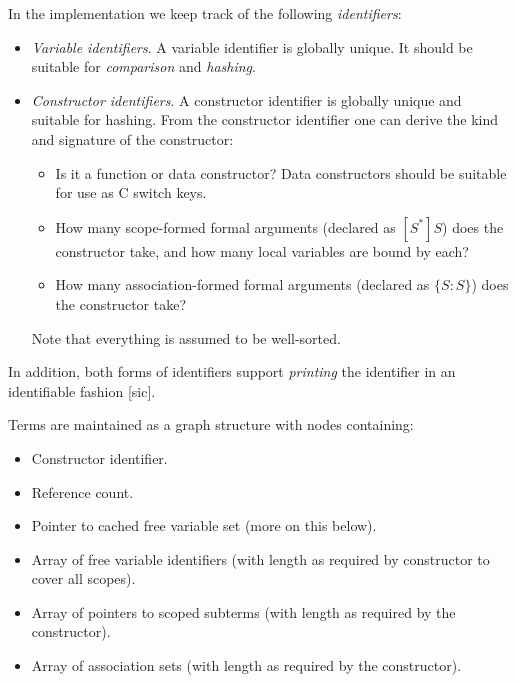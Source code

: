\documentclass[letterpaper,11pt]{article}
\begin{document}
\begin{definition}[identifiers]
  In the implementation we keep track of the following \emph{identifiers}:
  \begin{itemize}

  \item \emph{Variable identifiers}. A variable identifier is globally unique. It should be suitable
    for \emph{comparison} and \emph{hashing}.

  \item \emph{Constructor identifiers}. A constructor identifier is globally unique and suitable for
    hashing. From the constructor identifier one can derive the kind and signature of the
    constructor:
    \begin{itemize}
    \item Is it a function or data constructor? Data constructors should be suitable for use as C
      switch keys.
    \item How many scope-formed formal arguments (declared as $[S^*]S$) does the constructor take,
      and how many local variables are bound by each?
    \item How many association-formed formal arguments (declared as $\{S:S\}$) does the constructor
      take?
    \end{itemize}
    Note that everything is assumed to be well-sorted.

  \end{itemize}
  In addition, both forms of identifiers support \emph{printing} the identifier in an identifiable
  fashion [sic].
\end{definition}

\begin{structure}
  Terms are maintained as a graph structure with nodes containing:
  \begin{itemize}
  \item Constructor identifier.
  \item Reference count.
  \item Pointer to cached free variable set (more on this below).
  \item Array of free variable identifiers (with length as required by constructor to cover all
    scopes).
  \item Array of pointers to scoped subterms (with length as required by the constructor).
  \item Array of association sets (with length as required by the constructor).
  \end{itemize}
\end{structure}
\end{document}

